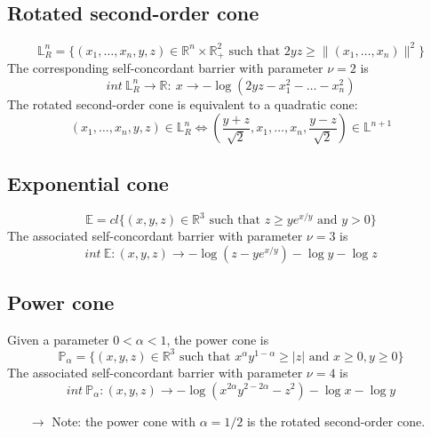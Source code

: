\documentclass[12pt, openany]{report}
\newcommand{\R}{\mathbb{R}}
\theoremstyle{definition}
\begin{document}
\subsection{Rotated second-order cone}
\begin{equation}
    \mathbb{L}_R^n = \{(x_1,\dots,x_n,y,z)\in \R^n\times \R^2_+ \text{ such that }2yz \ge \lVert (x_1,\dots,x_n)\rVert^2\}
\end{equation}
The corresponding self-concordant barrier with parameter $\nu=2$ is 
\begin{equation}
    int \: \mathbb{L}_R^n \rightarrow \R :\: x \rightarrow -\log(2yz-x_1^2 - \dots-x_n^2)
\end{equation}
The rotated second-order cone is equivalent to a quadratic cone:
\begin{equation}
    (x_1,\dots,x_n,y,z)\in \mathbb{L}_R^n \Longleftrightarrow \left(\frac{y+z}{\sqrt{2}}, x_1,\dots,x_n,\frac{y-z}{\sqrt{2}}\right)\in \mathbb{L}^{n+1}
\end{equation}
\subsection{Exponential cone}
\begin{equation}
    \mathbb{E} = cl\{(x,y,z)\in \R^3\text{ such that }z\ge ye^{x/y} \text{ and } y>0\}
\end{equation}
The associated self-concordant barrier with parameter $\nu=3$ is
\begin{equation}
    int \: \mathbb{E} :(x,y,z) \rightarrow -\log (z-ye^{x/y})-\log y-\log z
\end{equation}
\subsection{Power cone}
Given a parameter $0<\alpha<1$, the power cone is 
\begin{equation}
    \mathbb{P}_\alpha = \{(x,y,z)\in \R^3 \text{ such that }x^\alpha y^{1-\alpha}\ge |z| \text{ and }x\ge0,y\ge0\}
\end{equation}
The associated self-concordant barrier with parameter $\nu=4$ is
\begin{equation}
    int \: \mathbb{P}_\alpha :(x,y,z) \rightarrow -\log (x^{2\alpha} y^{2-2\alpha}-z^2)-\log x -\log y 
\end{equation}
\begin{itemize}
    \item [$\rightarrow$] Note: the power cone with $\alpha=1/2$ is the rotated second-order cone.
\end{itemize}
\end{document}
